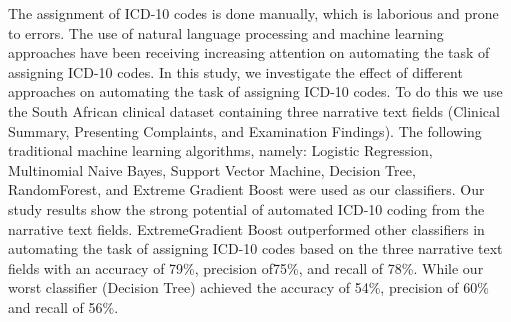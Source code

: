 The assignment of  ICD-10  codes is done manually,  which is laborious and prone to errors.  The use of natural language processing and machine learning approaches have been receiving increasing attention on automating the task of assigning ICD-10 codes. In this study, we investigate the effect of different approaches on automating the task of assigning ICD-10 codes.   To do this we use the South African clinical dataset containing three narrative text fields (Clinical Summary, Presenting Complaints, and Examination Findings). The following traditional machine learning algorithms, namely: Logistic Regression,  Multinomial Naive Bayes,  Support Vector Machine,  Decision Tree,  RandomForest, and Extreme Gradient Boost were used as our classifiers. Our study results show the strong potential of automated ICD-10 coding from the narrative text fields. ExtremeGradient Boost outperformed other classifiers in automating the task of assigning ICD-10 codes based on the three narrative text fields with an accuracy of 79\%, precision of75\%, and recall of 78\%. While our worst classifier (Decision Tree) achieved the accuracy of 54\%, precision of 60\% and recall of 56\%.
